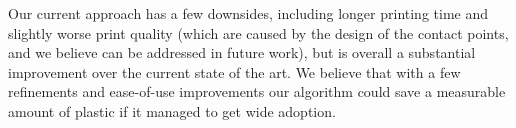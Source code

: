 Our current approach has a few downsides, including longer printing time
and slightly worse print quality (which are caused by the design of
the contact points, and we believe can be addressed in future work),
but is overall a substantial improvement over the current state of the art.
We believe that with a few refinements and ease-of-use improvements
our algorithm could save a measurable amount of plastic if
it managed to get wide adoption.


